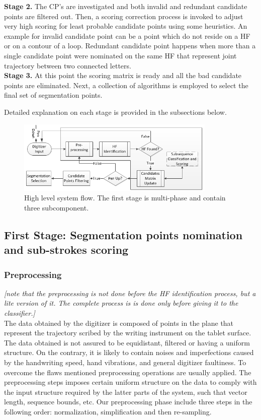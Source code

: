 \documentclass[journal,compsoc]{IEEEtran}
\begin{document}
\textbf{Stage 2.} The CP's are investigated and both invalid and redundant candidate points are filtered out. Then, a scoring correction process is invoked to adjust very high scoring for least probable candidate points using some heuristics. An example for invalid candidate point can be a point which do not reside on a HF or on a contour of a loop. Redundant candidate point happens when more than a single candidate point were nominated on the same HF  that represent joint trajectory between two connected letters.\\

\textbf{Stage 3.} At this point the scoring matrix is ready and all the bad candidate points are eliminated. Next, a collection of algorithms is employed to select the final set of segmentation points.

Detailed explanation on each stage is provided in the subsections below.

\begin{figure}
\centering
\includegraphics[width=9.5cm]{./figures/system_flow}
\caption{High level system flow. The first stage is multi-phase and contain three subcomponent. }
\label{fig:system_flow}
\end{figure}

\subsection{First Stage: Segmentation points nomination and sub-strokes scoring}
\subsubsection{Preprocessing}
\label{preprocessing}

\emph{[note that the preprocessing is not done before the HF identification process, but a lite version of it. The complete process is is done only before giving it to the classifier.]}\\

The data obtained by the digitizer is composed of points in the plane that represent the trajectory scribed by the writing instrument on the tablet surface. The data obtained is not assured to be equidistant, filtered or having a uniform structure. On the contrary, it is likely to contain noises and imperfections caused by the handwriting speed, hand vibrations, and general digitizer faultiness.   
To overcome the flaws mentioned preprocessing operations are usually applied. The preprocessing steps imposes certain uniform structure on the data to comply with the input structure required by the latter parts of the system, such that vector length, sequence bounds, etc.
Our preprocessing phase include three steps in the following order: normalization, simplification and then re-sampling.\\
\end{document}
